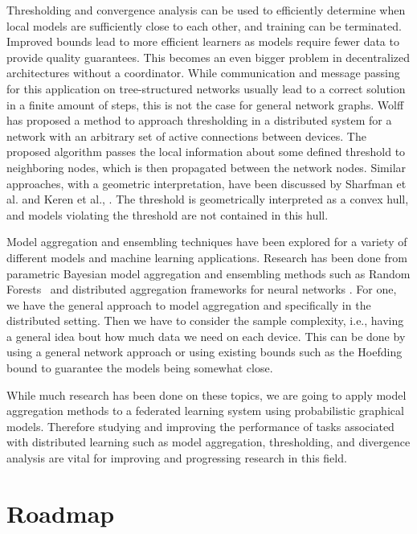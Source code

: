 Thresholding and convergence analysis can be used to efficiently determine when local models are sufficiently close to each other, and training can be terminated.
Improved bounds lead to more efficient learners as models require fewer data to provide quality guarantees.
This becomes an even bigger problem in decentralized architectures without a coordinator.
While communication and message passing for this application on tree-structured networks usually lead to a correct solution in a finite amount of steps, this is not the case for general network graphs.
Wolff \cite{wolff2013local} has proposed a method to approach thresholding in a distributed system for a network with an arbitrary set of active connections between devices.
The proposed algorithm passes the local information about some defined threshold to neighboring nodes, which is then propagated between the network nodes. 
Similar approaches, with a geometric interpretation, have been discussed by Sharfman et al. \cite{sharfman2007geometric} and Keren et al., \cite{keren2011shape}. 
The threshold is geometrically interpreted as a convex hull, and models violating the threshold are not contained in this hull. 

Model aggregation and ensembling techniques have been explored for a variety of different models and machine learning applications.
Research has been done from parametric Bayesian model aggregation \cite{hoeting1999bayesian}\cite{de2011bayesian} and ensembling methods such as Random Forests~\cite{breiman2001random} and distributed aggregation frameworks for neural networks \cite{mcmahan2016communication}.
For one, we have the general approach to model aggregation and specifically in the distributed setting.
Then we have to consider the sample complexity, i.e., having a general idea bout how much data we need on each device.
This can be done by using a general network approach or using existing bounds such as the Hoefding bound to guarantee the models being somewhat close.

While much research has been done on these topics, we are going to apply model aggregation methods to a federated learning system using probabilistic graphical models.
Therefore studying and improving the performance of tasks associated with distributed learning such as model aggregation, thresholding, and divergence analysis are vital for improving and progressing research in this field.

\section{Roadmap}

